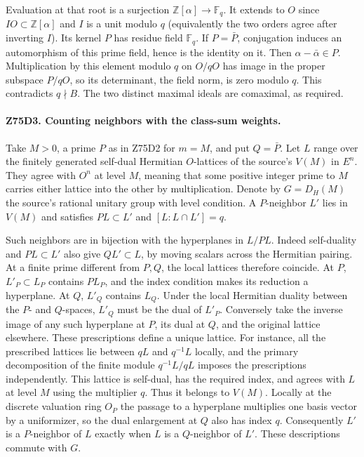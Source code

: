 Evaluation at that root is a surjection $\mathbb Z[\alpha]\to\mathbb F_q$.
It extends to $O$ since $IO\subset\mathbb Z[\alpha]$ and $I$ is a
unit modulo $q$ (equivalently the two orders agree after inverting $I$).
Its kernel $P$ has residue field $\mathbb F_q$. If $P=\bar P$,
conjugation induces an automorphism of this prime field, hence is
the identity on it. Then $\alpha-\bar\alpha\in P$. Multiplication
by this element modulo $q$ on $O/qO$ has image in the proper
subspace $P/qO$, so its determinant, the field norm, is zero
modulo $q$. This contradicts $q\nmid B$. The two distinct maximal
ideals are comaximal, as required.

\paragraph{Z75D3. Counting neighbors with the class-sum weights.}
Take $M>0$, a prime $P$ as in Z75D2 for $m=M$, and put $Q=\bar P$.
Let $L$ range over the finitely generated self-dual Hermitian
$O$-lattices of the source's $V(M)$ in $E^n$. They agree with
$O^n$ at level $M$, meaning that some positive integer prime to $M$
carries either lattice into the other by multiplication. Denote by
$G=D_H(M)$ the source's rational unitary group with level condition.
A $P$-neighbor $L'$ lies in $V(M)$ and satisfies
$PL\subset L'$ and $[L:L\cap L']=q$.

Such neighbors are in bijection with the hyperplanes in $L/PL$.
Indeed self-duality and $PL\subset L'$ also give $QL'\subset L$,
by moving scalars across the Hermitian pairing. At a finite prime
different from $P,Q$, the local lattices therefore coincide.
At $P$, $L'_P\subset L_P$ contains $P L_P$, and the index condition
makes its reduction a hyperplane. At $Q$, $L'_Q$ contains $L_Q$.
Under the local Hermitian duality between the $P$- and $Q$-spaces,
$L'_Q$ must be the dual of $L'_P$. Conversely take the inverse
image of any such hyperplane at $P$, its dual at $Q$, and the
original lattice elsewhere. These prescriptions define a unique
lattice. For instance, all the prescribed lattices lie between
$qL$ and $q^{-1}L$ locally, and the primary decomposition of the
finite module $q^{-1}L/qL$ imposes the prescriptions independently.
This lattice is self-dual, has the required index, and agrees
with $L$ at level $M$ using the multiplier $q$. Thus it belongs
to $V(M)$. Locally at the discrete valuation ring $O_P$ the passage
to a hyperplane multiplies one basis vector by a uniformizer,
so the dual enlargement at $Q$ also has index $q$. Consequently
$L'$ is a $P$-neighbor of $L$ exactly when $L$ is a $Q$-neighbor
of $L'$. These descriptions commute with $G$.

